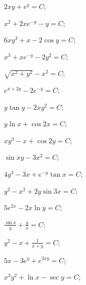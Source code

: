 	\label{sol:firstorder:totalderiv}
	\begin{enumsols}

		\item \( 2xy + e^{y} = C \); \sfill %
		\item \( x^2 + 2x e^{-y} - y = C \); \sfill %
		\item \( 6xy^3 + x - 2 \cos{y} = C \); \sfill %
		\item \( x^3 + xe^{-y} - 2y^2 = C \); \sfill %
		\item \( \sqrt{x^2 + y^2} - x^2 = C \); \sfill %
		\item \( e^{x + 2y} - 2e^{-y} = C \); \sfill %
		\item \( y \tan{y} - 2xy^2 = C \); \sfill %
		\item \( y \ln{x} + \cos{2x} = C \); \sfill %
		\item \( xy^3 - x + \cos{2y} = C \); \sfill %
		\item \( \sin{xy} - 3x^2 = C \); \sfill %
		\item \( 4y^3 - 3x + e^{-y} \tan{x} = C \); \sfill %
		\item \( y^2 - x^2 + 2y \sin{3x} = C \); \sfill %
		\item \( 5e^{2x} - 2x \ln{y} = C \); \sfill %
		\item \( \frac{\sin{x}}{y} + \frac{y}{x} = C \); \sfill %
		\item \( y^2 - x + \frac{1}{x + y} = C \); \sfill %
		\item \( 5x - 3e^{y} + e^{2xy} = C \); \sfill %
		\item \( x^3 y^2 + \ln{x} - \sec{y} = C \); \sfill %

\end{enumsols}
